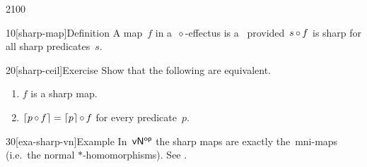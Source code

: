 \begin{parsec}{2100}%
\begin{point}{10}[sharp-map]{Definition}%
A map~$f$ in a~$\diamond$-effectus is a~
    provided~$s \mathop{\circ} f$ is sharp for all sharp predicates~$s$.
\end{point}
\begin{point}{20}[sharp-ceil]{Exercise}%
Show that the following are equivalent.
\begin{enumerate}
    \item $f$ is a sharp map.
    \item $\left\lceil p \mathop{\circ} f\right\rceil = \left\lceil p\right\rceil\mathop{\circ} f$
            for every predicate~$p$.
\end{enumerate}
\end{point}
\spacingfix{}
\begin{point}{30}[exa-sharp-vn]{Example}%
In~${\mathsf{vN}}{^{\mathsf{op}}}$ the sharp maps are exactly the~mni-maps
(i.e.~the normal $*$-homomorphisms).
See .
\end{point}
    
\end{parsec}

